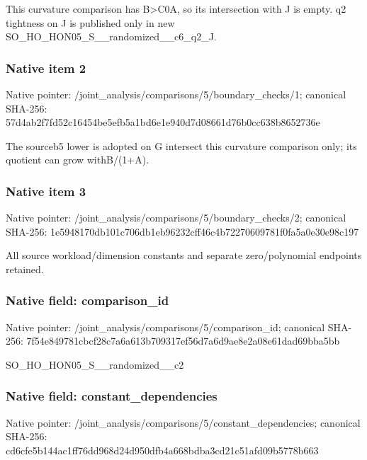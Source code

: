 \documentclass[10pt,a4paper]{article}
\begin{document}
\begingroup\raggedright\sloppy This curvature comparison has B>C0A,\allowbreak{} so its intersection with J is empty. q2 tightness on J is published only in new SO\_\allowbreak{}HO\_\allowbreak{}HON05\_\allowbreak{}S\_\allowbreak{}\_\allowbreak{}randomized\_\allowbreak{}\_\allowbreak{}c6\_\allowbreak{}q2\_\allowbreak{}J.\par\endgroup

\subsubsection{Native item 2}
Native pointer: /joint\_\allowbreak{}analysis/comparisons/5/boundary\_\allowbreak{}checks/1; canonical SHA-256: 57d4ab2f7fd52c16454be5efb5a1bd6e1e940d7d08661d76b0cc638b8652736e

\begingroup\raggedright\sloppy The sourceb5 lower is adopted on G intersect this curvature comparison only;\allowbreak{} its quotient can grow withB/\allowbreak{}(1+A).\par\endgroup

\subsubsection{Native item 3}
Native pointer: /joint\_\allowbreak{}analysis/comparisons/5/boundary\_\allowbreak{}checks/2; canonical SHA-256: 1e5948170db101c706db1eb96232cff46c4b72270609781f0fa5a0e30e98c197

\begingroup\raggedright\sloppy All source workload/\allowbreak{}dimension constants and separate zero/\allowbreak{}polynomial endpoints retained.\par\endgroup

\subsubsection{Native field: comparison\_\allowbreak{}id}
Native pointer: /joint\_\allowbreak{}analysis/comparisons/5/comparison\_\allowbreak{}id; canonical SHA-256: 7f54e849781cbcf28c7a6a613b709317ef56d7a6d9ae8e2a08e61dad69bba5bb

\begingroup\raggedright\sloppy SO\_\allowbreak{}HO\_\allowbreak{}HON05\_\allowbreak{}S\_\allowbreak{}\_\allowbreak{}randomized\_\allowbreak{}\_\allowbreak{}c2\par\endgroup

\subsubsection{Native field: constant\_\allowbreak{}dependencies}
Native pointer: /joint\_\allowbreak{}analysis/comparisons/5/constant\_\allowbreak{}dependencies; canonical SHA-256: cd6cfe5b144ac1ff76dd968d24d950dfb4a668bdba3cd21c51afd09b5778b663
\end{document}

